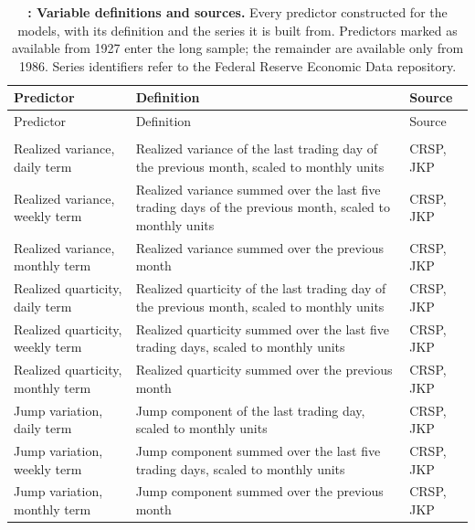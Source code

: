{\footnotesize
\captionsetup{justification=raggedright,labelsep=none,singlelinecheck=false,labelformat=boldlabel}
\setlength{\tabcolsep}{3pt}
\renewcommand{\arraystretch}{1.1}
\setlength{\emergencystretch}{3em}
\begin{longtable}{>{\raggedright\arraybackslash}m{3.3cm}>{\raggedright\arraybackslash}m{6.2cm}>{\raggedright\arraybackslash}m{2.9cm}}
\caption[Variable definitions and sources]{\footnotesize \textbf{: Variable definitions and sources.} Every predictor constructed for the models, with its definition and the series it is built from. Predictors marked as available from 1927 enter the long sample; the remainder are available only from 1986. Series identifiers refer to the Federal Reserve Economic Data repository.} \label{tab:vardefs} \\
\hline
Predictor & Definition & Source \\
\hline
\endfirsthead
\hline
Predictor & Definition & Source \\
\hline
\endhead
\hline
\endfoot
\multicolumn{3}{@{}l}{\textit{Panel A. Past realized-variance terms}} \\
Realized variance, daily term & Realized variance of the last trading day of the previous month, scaled to monthly units & CRSP, JKP \\
Realized variance, weekly term & Realized variance summed over the last five trading days of the previous month, scaled to monthly units & CRSP, JKP \\
Realized variance, monthly term & Realized variance summed over the previous month & CRSP, JKP \\
Realized quarticity, daily term & Realized quarticity of the last trading day of the previous month, scaled to monthly units & CRSP, JKP \\
Realized quarticity, weekly term & Realized quarticity summed over the last five trading days, scaled to monthly units & CRSP, JKP \\
Realized quarticity, monthly term & Realized quarticity summed over the previous month & CRSP, JKP \\
Jump variation, daily term & Jump component of the last trading day, scaled to monthly units & CRSP, JKP \\
Jump variation, weekly term & Jump component summed over the last five trading days, scaled to monthly units & CRSP, JKP \\
Jump variation, monthly term & Jump component summed over the previous month & CRSP, JKP \\

\end{longtable}}
